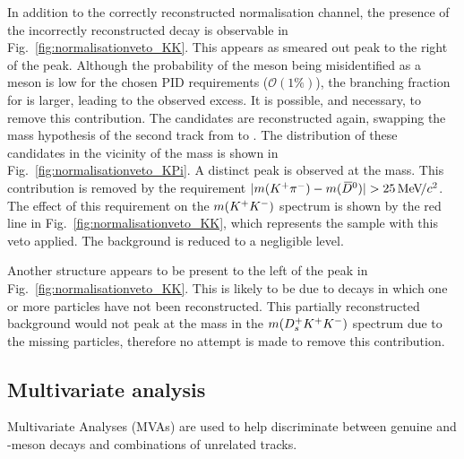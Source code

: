 In addition to the correctly reconstructed normalisation channel, the presence of the incorrectly reconstructed \decay{\Bp}{\Dsp(\decay{\Dzb}{\Kp\pim})} decay is observable in Fig.~\ref{fig:normalisationveto_KK}. This appears as smeared out peak to the right of the \Dzb peak. Although the probability of the \pim meson being misidentified as a \Km meson is low for the chosen PID requirements ($\mathcal{O}(1\%)$), the branching fraction for \decay{\Dzb}{\Kp\pim} is larger, leading to the observed excess. It is possible, and necessary, to remove this contribution. The \Kp\Km candidates are reconstructed again, swapping the mass hypothesis of the second track from \Km to \pim. The distribution of these candidates in the vicinity of the \Dzb mass is shown in Fig.~\ref{fig:normalisationveto_KPi}. A distinct peak is observed at the \Dzb mass. This contribution is removed by the requirement $|m({{K}^+}{{\pi}^-}) - m({{\kern 0.2em\overline{\kern -0.2em D}{}}{}^0})| > 25 {\mathrm{\,Me\kern -0.1em V\!/}c^2}$. The effect of this requirement on the $m({{K}^+}{{K}^-})$ spectrum is shown by the red line in Fig.~\ref{fig:normalisationveto_KK}, which represents the sample with this veto applied. The \decay{\Bp}{\Dsp(\decay{\Dzb}{\Kp\pim})} background is reduced to a negligible level.

Another structure appears to be present to the left of the \Dzb peak in Fig.~\ref{fig:normalisationveto_KK}. This is likely to be due to  decays in which one or more particles have not been reconstructed. This partially reconstructed background would not peak at the \Bp mass in the $m({{D}^+_{s}}{{K}^+}{{K}^-})$ spectrum due to the missing particles, therefore no attempt is made to remove this contribution.


\subsection{Multivariate analysis}
\label{sec:selection_MVA}

Multivariate Analyses (MVAs) are used to help discriminate between genuine \Dsp and \phiz-meson decays and combinations of unrelated tracks. 


